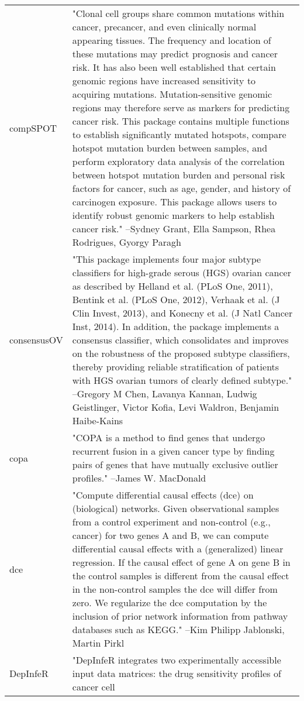 \begin{longtable}[t]{l>{\raggedright\arraybackslash}p{25em}}
compSPOT & "Clonal cell groups share common mutations within cancer,
precancer, and even clinically normal appearing tissues. The
frequency and location of these mutations may predict prognosis
and cancer risk. It has also been well established that certain
genomic regions have increased sensitivity to acquiring
mutations. Mutation-sensitive genomic regions may therefore
serve as markers for predicting cancer risk. This package
contains multiple functions to establish significantly mutated
hotspots, compare hotspot mutation burden between samples, and
perform exploratory data analysis of the correlation between
hotspot mutation burden and personal risk factors for cancer,
such as age, gender, and history of carcinogen exposure. This
package allows users to identify robust genomic markers to help
establish cancer risk." --Sydney Grant, Ella Sampson, Rhea Rodrigues, Gyorgy Paragh\\
consensusOV & "This package implements four major subtype classifiers for
high-grade serous (HGS) ovarian cancer as described by Helland
et al. (PLoS One, 2011), Bentink et al. (PLoS One, 2012),
Verhaak et al. (J Clin Invest, 2013), and Konecny et al. (J
Natl Cancer Inst, 2014). In addition, the package implements a
consensus classifier, which consolidates and improves on the
robustness of the proposed subtype classifiers, thereby
providing reliable stratification of patients with HGS ovarian
tumors of clearly defined subtype." --Gregory M Chen, Lavanya Kannan, Ludwig Geistlinger, Victor Kofia, Levi Waldron, Benjamin Haibe-Kains\\
\addlinespace
copa & "COPA is a method to find genes that undergo recurrent
fusion in a given cancer type by finding pairs of genes that
have mutually exclusive outlier profiles." --James W. MacDonald\\
dce & "Compute differential causal effects (dce) on (biological)
networks. Given observational samples from a control experiment
and non-control (e.g., cancer) for two genes A and B, we can
compute differential causal effects with a (generalized) linear
regression. If the causal effect of gene A on gene B in the
control samples is different from the causal effect in the
non-control samples the dce will differ from zero. We
regularize the dce computation by the inclusion of prior
network information from pathway databases such as KEGG." --Kim Philipp Jablonski, Martin Pirkl\\
DepInfeR & "DepInfeR integrates two experimentally accessible input
data matrices: the drug sensitivity profiles of cancer cell

\end{longtable}
